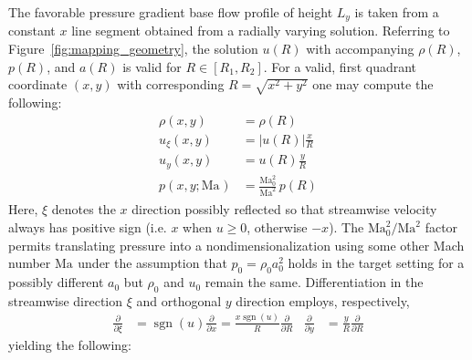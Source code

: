 \documentclass[letterpaper,11pt,nointlimits,reqno]{amsart}
\newcommand{\Mach}[1][]{\mbox{Ma}_{#1}}
\begin{document}
The favorable pressure gradient base flow profile of height $L_y$ is taken from
a constant $x$ line segment obtained from a radially varying solution.
Referring to Figure~\eqref{fig:mapping_geometry}, the solution
$u\!\left(R\right)$ with accompanying $\rho\!\left(R\right)$,
$p\!\left(R\right)$, and $a\!\left(R\right)$ is valid for
$R\in\left[R_1,R_2\right]$.  For a valid, first quadrant coordinate
$\left(x,y\right)$ with corresponding $R=\sqrt{x^2+y^2}$ one may compute the
following:
%
\begin{align}
    \rho \!\left(x, y\right) &= \rho\!\left(R\right)
\\  u_\xi\!\left(x, y\right) &= \left|u\!\left(R\right)\right| \frac{x}{R}
\\  u_y  \!\left(x, y\right) &=       u\!\left(R\right)        \frac{y}{R}
\\  p    \!\left(x, y; \Mach\right) &= \frac{\Mach[0]^2}{\Mach^2} \, p\!\left(R\right)
\end{align}
%
Here, $\xi$ denotes the $x$ direction possibly reflected so that streamwise
velocity always has positive sign (i.e. $x$ when $u\geq{}0$, otherwise $-x$).
The $\Mach[0]^2/\Mach^2$ factor permits translating pressure into a
nondimensionalization using some other Mach number $\Mach$ under the assumption
that $p_0 = \rho_0 a_0^2$ holds in the target setting for a possibly different
$a_0$ but $\rho_0$ and $u_0$ remain the same.
%
Differentiation in the streamwise direction $\xi$ and orthogonal $y$ direction
employs, respectively,
\begin{align}
    \frac{\partial}{\partial\xi}
 &= \operatorname{sgn}(u) \frac{\partial}{\partial{}x}
  = \frac{x \operatorname{sgn}(u)}{R} \frac{\partial}{\partial{}R}
&
    \frac{\partial}{\partial{}y}
 &= \frac{y}{R} \frac{\partial}{\partial{}R}
\end{align}
yielding the following:
%
\end{document}
